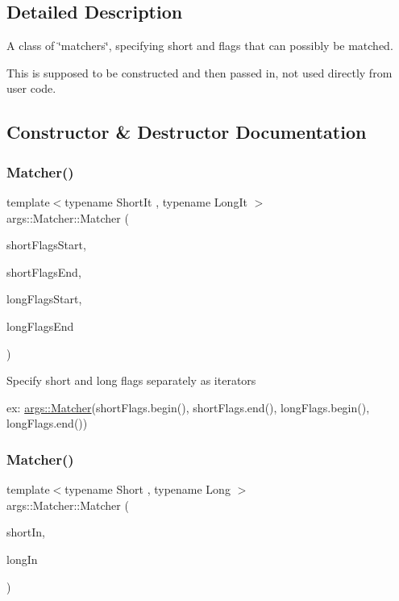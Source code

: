 \subsection{Detailed Description}
A class of \char`\"{}matchers\char`\"{}, specifying short and flags that can possibly be matched.

This is supposed to be constructed and then passed in, not used directly from user code. 

\subsection{Constructor \& Destructor Documentation}
\mbox{\label{classargs_1_1_matcher_a87fc200d9a51b3be654e0ec551304ec5}} 
\subsubsection{\texorpdfstring{Matcher()}{Matcher()}\hspace{0.1cm}{\footnotesize\ttfamily [1/4]}}
{\footnotesize\ttfamily template$<$typename Short\+It , typename Long\+It $>$ \\
args\+::\+Matcher\+::\+Matcher (\begin{DoxyParamCaption}\item[{Short\+It}]{short\+Flags\+Start,  }\item[{Short\+It}]{short\+Flags\+End,  }\item[{Long\+It}]{long\+Flags\+Start,  }\item[{Long\+It}]{long\+Flags\+End }\end{DoxyParamCaption})\hspace{0.3cm}{\ttfamily [inline]}}

Specify short and long flags separately as iterators

ex\+: {\ttfamily \hyperlink{classargs_1_1_matcher}{args\+::\+Matcher}(short\+Flags.\+begin(), short\+Flags.\+end(), long\+Flags.\+begin(), long\+Flags.\+end())} \mbox{\label{classargs_1_1_matcher_a62cfbb3db70f623153f8317abb5421dc}} 
\subsubsection{\texorpdfstring{Matcher()}{Matcher()}\hspace{0.1cm}{\footnotesize\ttfamily [2/4]}}
{\footnotesize\ttfamily template$<$typename Short , typename Long $>$ \\
args\+::\+Matcher\+::\+Matcher (\begin{DoxyParamCaption}\item[{Short \&\&}]{short\+In,  }\item[{Long \&\&}]{long\+In }\end{DoxyParamCaption})\hspace{0.3cm}{\ttfamily [inline]}}

